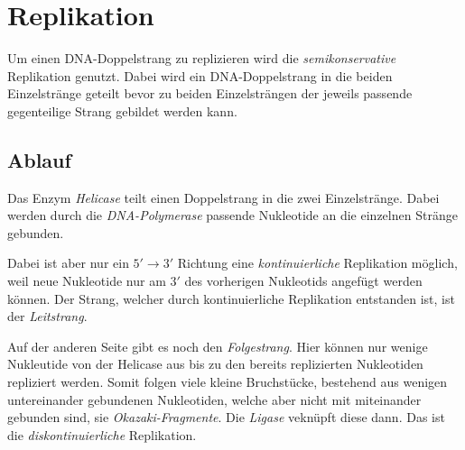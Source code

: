 \documentclass{article}
\begin{document}
\section{Replikation}
Um einen DNA-Doppelstrang zu replizieren wird die \emph{semikonservative} Replikation genutzt. Dabei wird ein DNA-Doppelstrang in die beiden Einzelstränge geteilt bevor zu beiden Einzelsträngen der jeweils passende gegenteilige Strang gebildet werden kann.
 
\subsection{Ablauf}
Das Enzym \emph{Helicase} teilt einen Doppelstrang in die zwei Einzelstränge. Dabei werden durch die \emph{DNA-Polymerase} passende Nukleotide an die einzelnen Stränge gebunden.
 
Dabei ist aber nur ein $5' \rightarrow 3'$ Richtung eine \emph{kon­ti­nu­ier­liche} Replikation möglich, weil neue Nukleotide nur am $3'$ des vorherigen Nukleotids angefügt werden können. Der Strang, welcher durch kontinuierliche Replikation entstanden ist, ist der \emph{Leitstrang}.
 
Auf der anderen Seite gibt es noch den \emph{Folgestrang}. Hier können nur wenige Nukleutide von der Helicase aus bis zu den bereits replizierten Nukleotiden repliziert werden. Somit folgen viele kleine Bruchstücke, bestehend aus wenigen untereinander gebundenen Nukleotiden, welche aber nicht mit miteinander gebunden sind, sie \emph{Okazaki-Fragmente}. Die \emph{Ligase} veknüpft diese dann. Das ist die \emph{diskon­ti­nu­ier­liche} Replikation.
\end{document}
